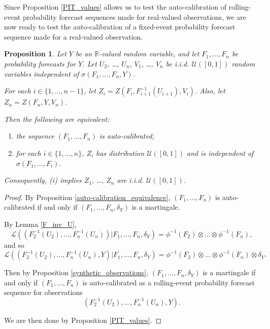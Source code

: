 \documentclass[aap]{imsart}
\theoremstyle{plain}
\newtheorem{proposition}[theorem]{Proposition}
\theoremstyle{definition}
\begin{document}
Since Proposition \ref{PIT_values} allows us to test the auto-calibration of rolling-event probability forecast sequences made for real-valued observations, we are now ready to test the auto-calibration of a fixed-event probability forecast sequence made for a real-valued observation.
\begin{proposition}\label{syn_PIT_values}
  Let $Y$ be an $\mathbb{R}$-valued random variable, and let $F_1, \ldots, F_n$ be probability forecasts for $Y$. Let $U_2$, \ldots, $U_n$, $V_1$, \ldots, $V_n$ be i.i.d. $\mathcal{U}([0,1])$ random variables independent of $\sigma(F_1, \ldots, F_n, Y)$.

  For each $i \in \{1, \ldots, n-1\}$, let $Z_i = Z(F_i, F_{i+1}^{-1}(U_{i+1}), V_i)$. Also, let $Z_n = Z(F_n, Y, V_n)$.

  Then the following are equivalent:
\begin{enumerate}[label=(\roman*)]
\item the sequence $(F_1, \ldots, F_n)$ is auto-calibrated;
\item for each $i \in \{1, \ldots, n\}$, $Z_i$ has distribution $\mathcal{U}([0,1])$ and is independent of $\sigma(F_1, \ldots, F_i)$.
\end{enumerate}

  Consequently, {\normalfont (i)} implies $Z_1$, \ldots, $Z_n$ are i.i.d. $\mathcal{U}([0,1])$.
\end{proposition}

\begin{proof} By Proposition \ref{auto-calibration_equivalence}, $(F_1, \ldots, F_n)$ is auto-calibrated if and only if $(F_1, \ldots, F_n, \delta_Y)$ is a martingale.

  By Lemma \ref{F_inv_U},
\begin{equation*}
\mathcal{L}((F_2^{-1}(U_2), \ldots, F_n^{-1}(U_n))|F_1, \ldots, F_n, \delta_Y) = \phi^{-1}(F_2) \otimes \ldots \otimes \phi^{-1}(F_n),
\end{equation*}
and so
\begin{equation*}
  \mathcal{L}((F_2^{-1}(U_2), \ldots, F_n^{-1}(U_n), Y)|F_1, \ldots, F_n, \delta_Y) = \phi^{-1}(F_2) \otimes \ldots \otimes \phi^{-1}(F_n) \otimes \delta_Y.
\end{equation*}

  Then by Proposition \ref{synthetic_observations}, $(F_1, \ldots, F_n, \delta_Y)$ is a martingale if and only if $(F_1, \ldots, F_n)$ is auto-calibrated as a rolling-event probability forecast sequence for observations 
\begin{equation*}
  (F_2^{-1}(U_2), \ldots, F_n^{-1}(U_n), Y).
\end{equation*}

  We are then done by Proposition \ref{PIT_values}.
\end{proof}
\end{document}
